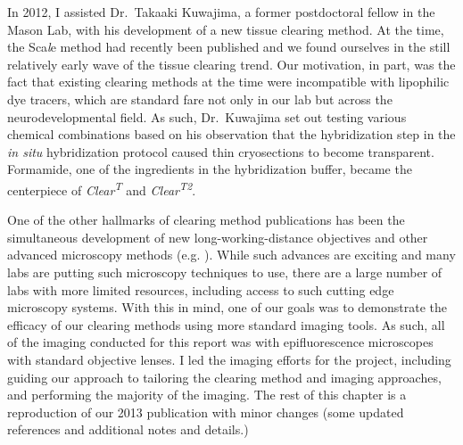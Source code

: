 In 2012, I assisted Dr.~Takaaki Kuwajima, a former postdoctoral fellow in the Mason Lab, with his development of a new tissue clearing method.
At the time, the Sca{\it l}e method had recently been published \cite{hama2011scale} and we found ourselves in the still relatively early wave of the tissue clearing trend.
Our motivation, in part, was the fact that existing clearing methods at the time were incompatible with lipophilic dye tracers, which are standard fare not only in our lab but across the neurodevelopmental field.
As such, Dr.~Kuwajima set out testing various chemical combinations based on his observation that the hybridization step in the \emph{in situ} hybridization protocol caused thin cryosections to become transparent.
Formamide, one of the ingredients in the hybridization buffer, became the centerpiece of {\it Clear\textsuperscript{T}} and {\it Clear\textsuperscript{T2}}.

One of the other hallmarks of clearing method publications has been the simultaneous development of new long-working-distance objectives and other advanced microscopy methods (e.g. ).
While such advances are exciting and many labs are putting such microscopy techniques to use, there are a large number of labs with more limited resources, including access to such cutting edge microscopy systems.
With this in mind, one of our goals was to demonstrate the efficacy of our clearing methods using more standard imaging tools.
As such, all of the imaging conducted for this report was with epifluorescence microscopes with standard objective lenses.
I led the imaging efforts for the project, including guiding our approach to tailoring the clearing method and imaging approaches, and performing the majority of the imaging.
The rest of this chapter is a reproduction of our 2013 publication \cite{kuwajima2013cleart} with minor changes (some updated references and additional notes and details.)

